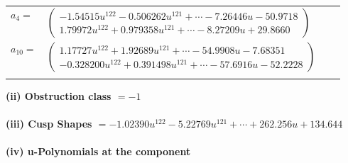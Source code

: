 \documentclass[1p]{elsarticle_modified}
\theoremstyle{definition}
\begin{document}
\begin{tabular}{m{7pt} m{180pt} m{7pt} m{180pt} }
\flushright $a_{4}=$&$\begin{pmatrix}-1.54515 u^{122}-0.506262 u^{121}+\cdots-7.26446 u-50.9718\\1.79972 u^{122}+0.979358 u^{121}+\cdots-8.27209 u+29.8660\end{pmatrix}$ \\
\flushright $a_{10}=$&$\begin{pmatrix}1.17727 u^{122}+1.92689 u^{121}+\cdots-54.9908 u-7.68351\\-0.328200 u^{122}+0.391498 u^{121}+\cdots-57.6916 u-52.2228\end{pmatrix}$\\&\end{tabular}
\flushleft \textbf{(ii) Obstruction class $= -1$}\\~\\
\flushleft \textbf{(iii) Cusp Shapes $= -1.02390 u^{122}-5.22769 u^{121}+\cdots+262.256 u+134.644$}\\~\\
\newpage\renewcommand{\arraystretch}{1}
\flushleft \textbf{(iv) u-Polynomials at the component}\newline \\
\end{document}
